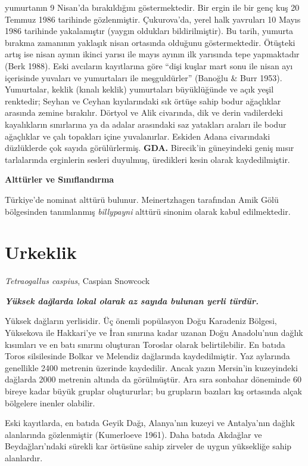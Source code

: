\documentclass[
  letterpaper,
  DIV=11,
  numbers=noendperiod]{scrreprt}
\begin{document}
yumurtanın 9 Nisan'da bırakıldığını göstermektedir. Bir ergin ile bir
genç kuş 20 Temmuz 1986 tarihinde gözlenmiştir. Çukurova'da, yerel halk
yavruları 10 Mayıs 1986 tarihinde yakalamıştır (yaygın oldukları
bildirilmiştir). Bu tarih, yumurta bırakma zamanının yaklaşık nisan
ortasında olduğunu göstermektedir. Ötüşteki artış ise nisan ayının
ikinci yarısı ile mayıs ayının ilk yarısında tepe yapmaktadır (Berk
1988). Eski avcıların kayıtlarına göre ``dişi kuşlar mart sonu ile nisan
ayı içerisinde yuvaları ve yumurtaları ile meşguldürler'' (Banoğlu \&
Burr 1953). Yumurtalar, keklik (kınalı keklik) yumurtaları büyüklüğünde
ve açık yeşil renktedir; Seyhan ve Ceyhan kıyılarındaki sık örtüşe sahip
bodur ağaçlıklar arasında zemine bırakılır. Dörtyol ve Alik civarında,
dik ve derin vadilerdeki kayalıkların sınırlarına ya da adalar
arasındaki saz yatakları araları ile bodur ağaçlıklar ve çalı topakları
içine yuvalanırlar. Eskiden Adana civarındaki düzlüklerde çok sayıda
görülürlermiş. \textbf{GDA.} Birecik'in güneyindeki geniş mısır
tarlalarında erginlerin sesleri duyulmuş, üredikleri kesin olarak
kaydedilmiştir.

\textbf{Alttürler ve Sınıflandırma}

Türkiye'de nominat alttürü bulunur. Meinertzhagen tarafından Amik Gölü
bölgesinden tanımlanmış \emph{billypayni} alttürü sinonim olarak kabul
edilmektedir.

\section{Urkeklik}\label{urkeklik}

\emph{Tetraogallus caspius}, Caspian Snowcock

\textbf{\emph{Yüksek dağlarda lokal olarak az sayıda bulunan yerli
türdür.}}

Yüksek dağların yerlisidir. Üç önemli popülasyon Doğu Karadeniz Bölgesi,
Yüksekova ile Hakkari'ye ve İran sınırına kadar uzanan Doğu Anadolu'nun
dağlık kısımları ve en batı sınırını oluşturan Toroslar olarak
belirtilebilir. En batıda Toros silsilesinde Bolkar ve Melendiz
dağlarında kaydedilmiştir. Yaz aylarında genellikle 2400 metrenin
üzerinde kaydedilir. Ancak yazın Mersin'in kuzeyindeki dağlarda 2000
metrenin altında da görülmüştür. Ara sıra sonbahar döneminde 60 bireye
kadar büyük gruplar oluştururlar; bu grupların bazıları kış ortasında
alçak bölgelere inenler olabilir.

Eski kayıtlarda, en batıda Geyik Dağı, Alanya'nın kuzeyi ve Antalya'nın
dağlık alanlarında gözlenmiştir (Kumerloeve 1961). Daha batıda Akdağlar
ve Beydağları'ndaki sürekli kar örtüsüne sahip zirveler de uygun
yüksekliğe sahip alanlardır.
\end{document}
